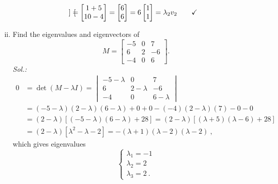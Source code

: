 \begin{example}
\begin{enumerate}[(i)]
\[\begin{bmatrix}
		\end{bmatrix} = \begin{bmatrix}
		1+5 \\ 10 - 4
		\end{bmatrix} = \begin{bmatrix}
		6 \\ 6
		\end{bmatrix} = 6 \begin{bmatrix}
		1 \\ 1
		\end{bmatrix} = \lambda_2 v_2
		\qquad \text{\checkmark} \]
	\item Find the eigenvalues and eigenvectors of
		\[ M = \begin{bmatrix}
		-5 & 0 & 7 \\ 6 & 2 & -6 \\ -4 & 0 & 6 
		\end{bmatrix}. \]
		{\it Sol.:}
		\begin{equation*}
		\begin{split}
		0 & = \det (M-\lambda I) = \begin{vmatrix}  
			-5-\lambda & 0 & 7 \\ 
			6 & 2-\lambda & -6 \\ 
			-4 & 0 & 6-\lambda 
		\end{vmatrix} \\
		& = (-5-\lambda)(2-\lambda)(6-\lambda) + 0 + 0 - (-4)(2-\lambda)(7)- 0 - 0 \\
		& = (2-\lambda) \left[ (-5-\lambda)(6-\lambda)+28 \right]
		= (2-\lambda) \left[ (\lambda+5)(\lambda-6)+28 \right] \\
		& = (2-\lambda) \left[ \lambda^2-\lambda-2 \right]
		= - (\lambda+1) (\lambda-2) (\lambda-2) \:,
		\end{split}
		\end{equation*}
		which gives eigenvalues
		\[ \begin{cases} \lambda_1 = -1 \\ \lambda_2 = 2 \\ \lambda_3 = 2 \:. \end{cases} \]
		

\end{enumerate}
\end{example}
